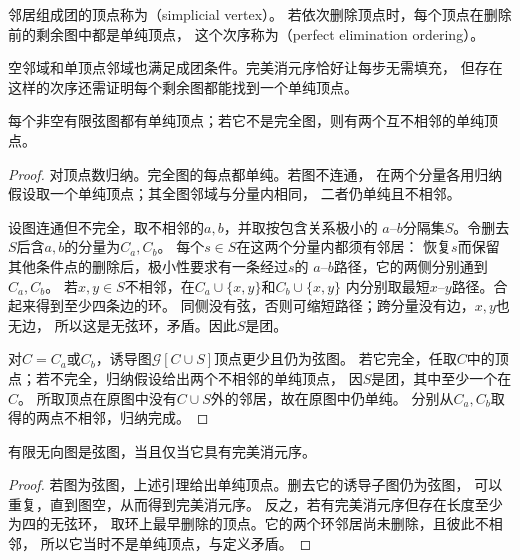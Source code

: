 \begin{definition}[单纯顶点与完美消元序]
  \label{def:graph-theory-perfect-elimination}
  邻居组成团的顶点称为（simplicial vertex）。
  若依次删除顶点时，每个顶点在删除前的剩余图中都是单纯顶点，
  这个次序称为（perfect elimination ordering）。
\end{definition}

空邻域和单顶点邻域也满足成团条件。完美消元序恰好让每步无需填充，
但存在这样的次序还需证明每个剩余图都能找到一个单纯顶点。

\begin{lemma}[弦图的单纯顶点]
  \label{lem:graph-theory-chordal-simplicial-vertex}
  每个非空有限弦图都有单纯顶点；若它不是完全图，则有两个互不相邻的单纯顶点。
\end{lemma}

\begin{proof}
对顶点数归纳。完全图的每点都单纯。若图不连通，
在两个分量各用归纳假设取一个单纯顶点；其全图邻域与分量内相同，
二者仍单纯且不相邻。

设图连通但不完全，取不相邻的\(a,b\)，并取按包含关系极小的
\(a\)--\(b\)分隔集\(S\)。令删去\(S\)后含\(a,b\)的分量为\(C_a,C_b\)。
每个\(s\in S\)在这两个分量内都须有邻居：
恢复\(s\)而保留其他条件点的删除后，极小性要求有一条经过\(s\)的
\(a\)--\(b\)路径，它的两侧分别通到\(C_a,C_b\)。
若\(x,y\in S\)不相邻，在\(C_a\cup\{x,y\}\)和\(C_b\cup\{x,y\}\)
内分别取最短\(x\)--\(y\)路径。合起来得到至少四条边的环。
同侧没有弦，否则可缩短路径；跨分量没有边，\(x,y\)也无边，
所以这是无弦环，矛盾。因此\(S\)是团。

对\(C=C_a\)或\(C_b\)，诱导图\(\mathcal G[C\cup S]\)顶点更少且仍为弦图。
若它完全，任取\(C\)中的顶点；若不完全，归纳假设给出两个不相邻的单纯顶点，
因\(S\)是团，其中至少一个在\(C\)。
所取顶点在原图中没有\(C\cup S\)外的邻居，故在原图中仍单纯。
分别从\(C_a,C_b\)取得的两点不相邻，归纳完成。
\end{proof}

\begin{theorem}[弦图与完美消元序]
  \label{thm:graph-theory-chordal-perfect-elimination}
  有限无向图是弦图，当且仅当它具有完美消元序。
\end{theorem}

\begin{proof}
若图为弦图，上述引理给出单纯顶点。删去它的诱导子图仍为弦图，
可以重复，直到图空，从而得到完美消元序。
反之，若有完美消元序但存在长度至少为四的无弦环，
取环上最早删除的顶点。它的两个环邻居尚未删除，且彼此不相邻，
所以它当时不是单纯顶点，与定义矛盾。
\end{proof}

